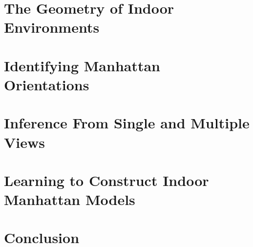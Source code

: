\documentclass[a4paper,11pt]{report}
\begin{document}
\chapter{The Geometry of Indoor Environments}
\label{chap:geometry}


%
\def\localpath{RecoveringOrientation}
\graphicspath{{\localpath/figures/}}
\chapter{Identifying Manhattan Orientations}
\label{chap:orientation}


%
\def\localpath{Inference}
\graphicspath{{\localpath/figures/}}
\chapter{Inference From Single and Multiple Views}
\label{chap:inference}


%
\def\localpath{Learning}
\graphicspath{{\localpath/figures/}}
\chapter{Learning to Construct Indoor Manhattan Models}
\label{chap:learning}


%
\def\localpath{Conclusion}
\graphicspath{{\localpath/figures/}}
\chapter{Conclusion}
\label{chap:conclusion}

\end{document}

